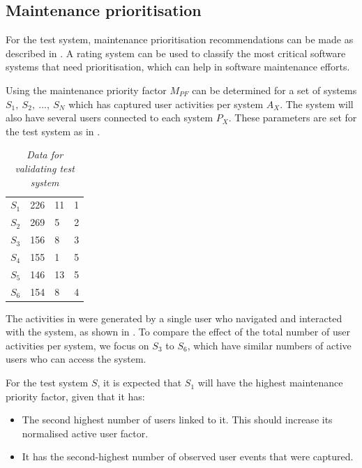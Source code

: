 \subsection{Maintenance prioritisation}
For the test system, maintenance prioritisation recommendations can be made as described in . A rating system can be used to classify the most critical software systems that need prioritisation, which can help in software maintenance efforts.\par Using  the maintenance priority factor $M_{PF}$ can be determined for a set of systems {$S_1,~S_2,~...,~S_N$} which has captured user activities per system $A_X$. The system will also have several users connected to each system $P_X$. These parameters are set for the test system as in .

\begin{table}[!htb]
	\centering
	\caption[Data for validating test system]
	{\textit{Data for validating test system}}
	\label{tbl:ch3_testData}
	\begin{tabularx}{\textwidth}{XXXX}
		\toprule
		\thead{System ($S_X$)} & \thead{Users per system ($P_X$)} & \thead{Number of events ($A_X$)} & \thead{Expected priority} \\
		\midrule
		\rowcolor{lightgray}
		$S_1$ & 226 & 11 & 1 \\
		$S_2$ & 269 & 5 & 2 \\
		\rowcolor{lightgray}
		$S_3$ & 156 & 8 & 3 \\
		$S_4$ & 155 & 1 & 5 \\
		\rowcolor{lightgray}
		$S_5$ & 146 & 13 & 5 \\
		$S_6$ & 154 & 8 & 4 \\
		\bottomrule
	\end{tabularx}
\end{table}

The activities in  were generated by a single user who navigated and interacted with the system, as shown in . To compare the effect of the total number of user activities per system, we focus on $S_3$ to $S_6$, which have similar numbers of active users who can access the system.\par For the test system $S$, it is expected that $S_1$ will have the highest maintenance priority factor, given that it has:

\begin{itemize}
	\item The second highest number of users linked to it. This should increase its normalised active user factor.
	\item It has the second-highest number of observed user events that were captured.
\end{itemize}

